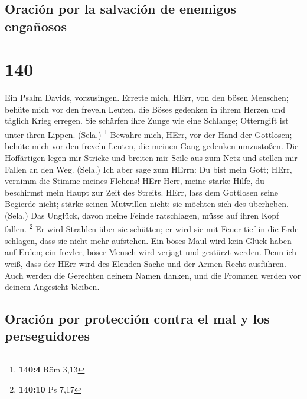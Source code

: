 \hypertarget{oraciuxf3n-por-la-salvaciuxf3n-de-enemigos-engauxf1osos}{%
\subsection{Oración por la salvación de enemigos
engañosos}\label{oraciuxf3n-por-la-salvaciuxf3n-de-enemigos-engauxf1osos}}

\hypertarget{section-139}{%
\section{140}\label{section-139}}

 Ein Psalm Davids, vorzusingen.  Errette
mich, HErr, von den bösen Menschen; behüte mich vor den freveln Leuten,
 die Böses gedenken in ihrem Herzen und täglich Krieg
erregen.  Sie schärfen ihre Zunge wie eine Schlange;
Otterngift ist unter ihren Lippen. (Sela.) \footnote{\textbf{140:4} Röm
  3,13}  Bewahre mich, HErr, vor der Hand der Gottlosen;
behüte mich vor den freveln Leuten, die meinen Gang gedenken umzustoßen.
 Die Hoffärtigen legen mir Stricke und breiten mir Seile
aus zum Netz und stellen mir Fallen an den Weg. (Sela.) 
Ich aber sage zum HErrn: Du bist mein Gott; HErr, vernimm die Stimme
meines Flehens!  HErr Herr, meine starke Hilfe, du
beschirmst mein Haupt zur Zeit des Streits.  HErr, lass
dem Gottlosen seine Begierde nicht; stärke seinen Mutwillen nicht: sie
möchten sich des überheben. (Sela.)  Das Unglück, davon
meine Feinde ratschlagen, müsse auf ihren Kopf fallen. \footnote{\textbf{140:10}
  Ps 7,17}  Er wird Strahlen über sie schütten; er wird
sie mit Feuer tief in die Erde schlagen, dass sie nicht mehr aufstehen.
 Ein böses Maul wird kein Glück haben auf Erden; ein
frevler, böser Mensch wird verjagt und gestürzt werden. 
Denn ich weiß, dass der HErr wird des Elenden Sache und der Armen Recht
ausführen.  Auch werden die Gerechten deinem Namen
danken, und die Frommen werden vor deinem Angesicht bleiben.

\hypertarget{oraciuxf3n-por-protecciuxf3n-contra-el-mal-y-los-perseguidores}{%
\subsection{Oración por protección contra el mal y los
perseguidores}\label{oraciuxf3n-por-protecciuxf3n-contra-el-mal-y-los-perseguidores}}

